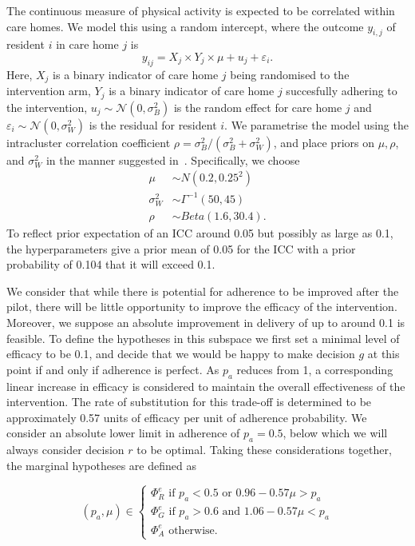 \documentclass[AMA,STIX1COL]{WileyNJD-v2}
\begin{document}
The continuous measure of physical activity is expected to be correlated within care homes. We model this using a random intercept, where the outcome $y_{i,j}$ of resident $i$ in care home $j$ is
\begin{equation}
y_{ij} = X_{j} \times Y_{j} \times \mu + u_{j} + \varepsilon_{i}.
\end{equation}
Here, $X_{j}$ is a binary indicator of care home $j$ being randomised to the intervention arm, $Y_{j}$ is a binary indicator of care home $j$ succesfully adhering to the intervention, $u_{j} \sim \mathcal{N}(0, \sigma_{B}^{2})$ is the random effect for care home $j$ and $\varepsilon_{i} \sim \mathcal{N}(0, \sigma_{W}^{2})$ is the residual for resident $i$. We parametrise the model using the intracluster correlation coefficient $\rho = \sigma_{B}^{2} / (\sigma_{B}^{2} + \sigma_{W}^{2})$, and place priors on $\mu, \rho$, and $\sigma_{W}^{2}$ in the manner suggested in~\cite{Spiegelhalter2001}. Specifically, we choose
\begin{align}
\mu & \sim N(0.2, 0.25^{2}) \\
\sigma_{W}^{2} & \sim \Gamma^{-1}(50, 45) \\
\rho & \sim Beta(1.6, 30.4).
\end{align}
To reflect prior expectation of an ICC around 0.05 but possibly as large as 0.1, the hyperparameters give a prior mean of 0.05 for the ICC with a prior probability of 0.104 that it will exceed 0.1. 

We consider that while there is potential for adherence to be improved after the pilot, there will be little opportunity to improve the efficacy of the intervention. Moreover, we suppose an absolute improvement in delivery of up to around 0.1 is feasible. To define the hypotheses in this subspace we first set a minimal level of efficacy to be 0.1, and decide that we would be happy to make decision $g$ at this point if and only if adherence is perfect. As $p_{a}$ reduces from 1, a corresponding linear increase in efficacy is considered to maintain the overall effectiveness of the intervention. The rate of substitution for this trade-off is determined to be approximately 0.57 units of efficacy per unit of adherence probability. We consider an absolute lower limit in adherence of $p_{a} = 0.5$, below which we will always consider decision $r$ to be optimal. Taking these considerations together, the marginal hypotheses are defined as

\begin{equation}
  (p_{a}, \mu) \in \begin{cases}
               \Phi^e_R \text{ if } p_{a} < 0.5 \text{ or } 0.96-0.57\mu > p_{a} \\
               \Phi^e_G \text{ if } p_{a} > 0.6 \text{ and } 1.06-0.57\mu < p_{a} \\
               \Phi^e_A \text{ otherwise.}
            \end{cases}
\end{equation}
\end{document}
